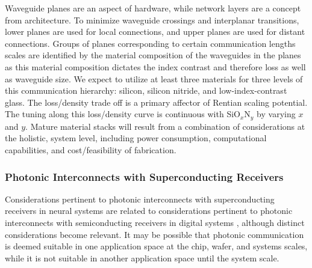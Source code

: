 \vspace{3em}
Waveguide planes are an aspect of hardware, while network layers are a concept from architecture. To minimize waveguide crossings and interplanar transitions, lower planes are used for local connections, and upper planes are used for distant connections. Groups of planes corresponding to certain communication lengths scales are identified by the material composition of the waveguides in the planes as this material composition dictates the index contrast and therefore loss as well as waveguide size. We expect to utilize at least three materials for three levels of this communication hierarchy: silicon, silicon nitride, and low-index-contrast glass. The loss/density trade off is a primary affector of Rentian scaling potential. The tuning along this loss/density curve is continuous with SiO$_x$N$_y$ by varying $x$ and $y$. Mature material stacks will result from a combination of considerations at the holistic, system level, including power consumption, computational capabilities, and cost/feasibility of fabrication.


\subsubsection{Photonic Interconnects with Superconducting Receivers}
Considerations pertinent to photonic interconnects with superconducting receivers in neural systems are related to considerations pertinent to photonic interconnects with semiconducting receivers in digital systems \cite{mi2009,mi2017}, although distinct considerations become relevant. It may be possible that photonic communication is deemed suitable in one application space at the chip, wafer, and systems scales, while it is not suitable in another application space until the system scale. 

